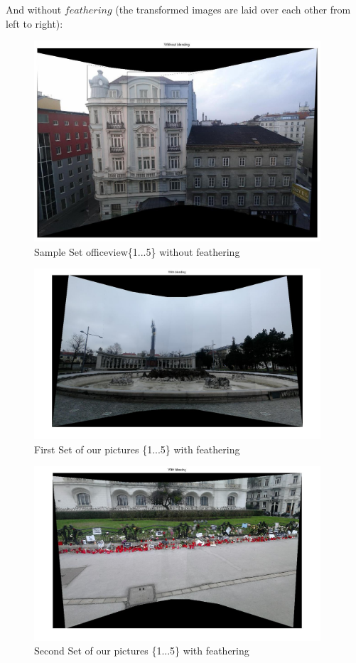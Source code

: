 \documentclass[subfigure,epsfig,fleqn,float,numbers=noenddot]{scrartcl}
\begin{document}
And without $feathering$ (the transformed images are laid over each other from left to right):
\begin{figure}[H]
		\centering
		\includegraphics[width=0.95\textwidth]{./img/withoutBlending2.jpg}
		\caption{Sample Set officeview\{1...5\} without feathering}
		\label{img:withoutBlend2}
\end{figure}

\begin{figure}[H]
		\centering
		\includegraphics[width=0.95\textwidth]{./img/soldier.jpg}
		\caption{First Set of our pictures \{1...5\} with feathering}
		\label{img:own1}
\end{figure}

\begin{figure}[H]
		\centering
		\includegraphics[width=0.95\textwidth]{./img/charlie.jpg}
		\caption{Second Set of our pictures \{1...5\} with feathering}
		\label{img:own2}
\end{figure}
\end{document}

